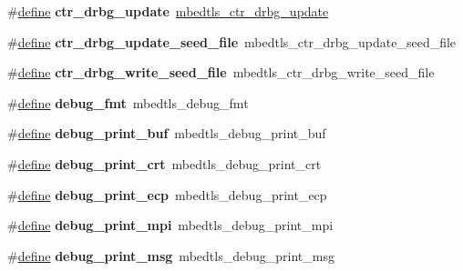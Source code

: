 \begin{DoxyCompactItemize}
\item 
\mbox{\label{compat-1_83_8h_aee691ec930b852b4214569c426ddb9c4}} 
\#\hyperlink{structdefine}{define} {\bfseries ctr\+\_\+drbg\+\_\+update}~\hyperlink{ctr__drbg_8h_a79d4bdb84d0c13f4bb28d5c3c6de4011}{mbedtls\+\_\+ctr\+\_\+drbg\+\_\+update}
\item 
\mbox{\label{compat-1_83_8h_a862e00c69776e0e0a4a010a1f5617250}} 
\#\hyperlink{structdefine}{define} {\bfseries ctr\+\_\+drbg\+\_\+update\+\_\+seed\+\_\+file}~mbedtls\+\_\+ctr\+\_\+drbg\+\_\+update\+\_\+seed\+\_\+file
\item 
\mbox{\label{compat-1_83_8h_af0d2ed8090d1d60f81667821e58a7b58}} 
\#\hyperlink{structdefine}{define} {\bfseries ctr\+\_\+drbg\+\_\+write\+\_\+seed\+\_\+file}~mbedtls\+\_\+ctr\+\_\+drbg\+\_\+write\+\_\+seed\+\_\+file
\item 
\mbox{\label{compat-1_83_8h_ac37ce81c43c6f7e995ab28fc88066159}} 
\#\hyperlink{structdefine}{define} {\bfseries debug\+\_\+fmt}~mbedtls\+\_\+debug\+\_\+fmt
\item 
\mbox{\label{compat-1_83_8h_a8d321f818c9ca88c92b3511837ba2410}} 
\#\hyperlink{structdefine}{define} {\bfseries debug\+\_\+print\+\_\+buf}~mbedtls\+\_\+debug\+\_\+print\+\_\+buf
\item 
\mbox{\label{compat-1_83_8h_a8757f896c3f76177a041eef9cb3bf17f}} 
\#\hyperlink{structdefine}{define} {\bfseries debug\+\_\+print\+\_\+crt}~mbedtls\+\_\+debug\+\_\+print\+\_\+crt
\item 
\mbox{\label{compat-1_83_8h_a57d17eb389c9237cee323b81aaaef4fd}} 
\#\hyperlink{structdefine}{define} {\bfseries debug\+\_\+print\+\_\+ecp}~mbedtls\+\_\+debug\+\_\+print\+\_\+ecp
\item 
\mbox{\label{compat-1_83_8h_ab98d372d1718db99dc81b20a43544f8d}} 
\#\hyperlink{structdefine}{define} {\bfseries debug\+\_\+print\+\_\+mpi}~mbedtls\+\_\+debug\+\_\+print\+\_\+mpi
\item 
\mbox{\label{compat-1_83_8h_ada837dc6ea426a824b73359f6df2fde9}} 
\#\hyperlink{structdefine}{define} {\bfseries debug\+\_\+print\+\_\+msg}~mbedtls\+\_\+debug\+\_\+print\+\_\+msg

\end{DoxyCompactItemize}
